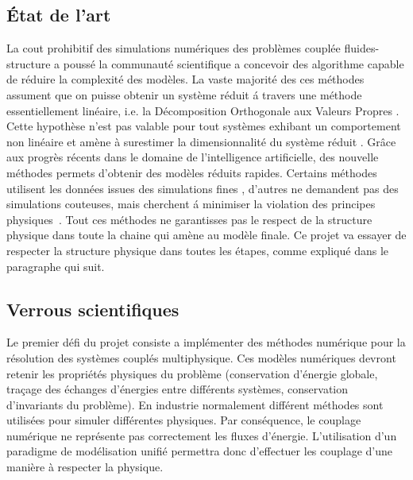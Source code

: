 \documentclass[french]{article}
\begin{document}
\subsection{État de l'art}
La cout prohibitif des simulations numériques des problèmes couplée fluides-structure a poussé la communauté scientifique a concevoir des algorithme capable de réduire la complexité des modèles. La vaste majorité des ces méthodes assument que on puisse obtenir un système réduit \'a travers une méthode essentiellement linéaire, i.e. la Décomposition Orthogonale aux Valeurs Propres \cite{shinde2019,tello2020fluid}. Cette hypothèse n'est pas valable pour tout systèmes exhibant un comportement non linéaire et amène à surestimer la dimensionnalité du système réduit \cite{kerschen2005}. Grâce aux progrès récents dans le domaine de l'intelligence artificielle, des nouvelle méthodes permets d'obtenir des modèles réduits rapides. Certains méthodes utilisent les données issues des simulations fines \cite{lee2020}, d'autres ne demandent pas des simulations couteuses, mais cherchent \'a minimiser la violation des principes physiques~\cite{sun2020physics}.  
Tout ces méthodes ne garantisses pas le respect de la structure physique dans toute la chaine qui amène au modèle finale. Ce projet va essayer de respecter la structure physique dans toutes les étapes, comme expliqué dans le paragraphe qui suit.


\subsection{Verrous scientifiques}


Le premier défi du projet consiste a implémenter des méthodes numérique pour la résolution des systèmes couplés multiphysique. Ces modèles numériques devront retenir les propriétés physiques du problème (conservation d'énergie globale, traçage des échanges d'énergies entre différents systèmes, conservation d'invariants du problème). En industrie normalement différent méthodes sont utilisées pour simuler différentes physiques. Par conséquence, le couplage numérique ne représente pas correctement les fluxes d'énergie. L'utilisation d'un paradigme de modélisation unifié permettra donc d'effectuer les couplage d'une manière à respecter la physique. \\
\end{document}
